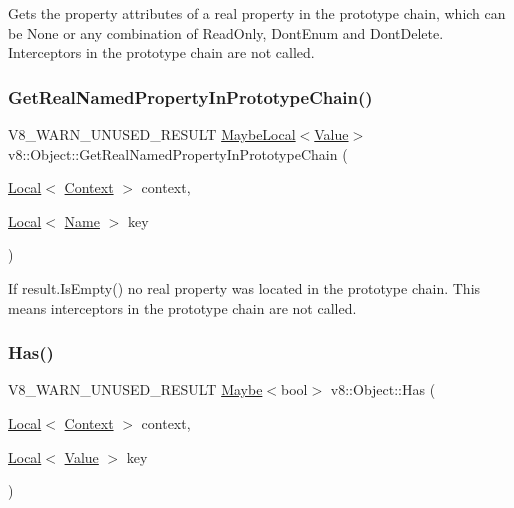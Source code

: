 Gets the property attributes of a real property in the prototype chain, which can be None or any combination of Read\+Only, Dont\+Enum and Dont\+Delete. Interceptors in the prototype chain are not called. \mbox{\label{classv8_1_1Object_afe68d490fc41783e30126ca547b7fc90}} 
\subsubsection{\texorpdfstring{Get\+Real\+Named\+Property\+In\+Prototype\+Chain()}{GetRealNamedPropertyInPrototypeChain()}}
{\footnotesize\ttfamily V8\+\_\+\+W\+A\+R\+N\+\_\+\+U\+N\+U\+S\+E\+D\+\_\+\+R\+E\+S\+U\+LT \mbox{\hyperlink{classv8_1_1MaybeLocal}{Maybe\+Local}}$<$\mbox{\hyperlink{classv8_1_1Value}{Value}}$>$ v8\+::\+Object\+::\+Get\+Real\+Named\+Property\+In\+Prototype\+Chain (\begin{DoxyParamCaption}\item[{\mbox{\hyperlink{classv8_1_1Local}{Local}}$<$ \mbox{\hyperlink{classv8_1_1Context}{Context}} $>$}]{context,  }\item[{\mbox{\hyperlink{classv8_1_1Local}{Local}}$<$ \mbox{\hyperlink{classv8_1_1Name}{Name}} $>$}]{key }\end{DoxyParamCaption})}

If result.\+Is\+Empty() no real property was located in the prototype chain. This means interceptors in the prototype chain are not called. \mbox{\label{classv8_1_1Object_a57d4819c2cc13715ed22dd23cdc84d7c}} 
\subsubsection{\texorpdfstring{Has()}{Has()}}
{\footnotesize\ttfamily V8\+\_\+\+W\+A\+R\+N\+\_\+\+U\+N\+U\+S\+E\+D\+\_\+\+R\+E\+S\+U\+LT \mbox{\hyperlink{classv8_1_1Maybe}{Maybe}}$<$bool$>$ v8\+::\+Object\+::\+Has (\begin{DoxyParamCaption}\item[{\mbox{\hyperlink{classv8_1_1Local}{Local}}$<$ \mbox{\hyperlink{classv8_1_1Context}{Context}} $>$}]{context,  }\item[{\mbox{\hyperlink{classv8_1_1Local}{Local}}$<$ \mbox{\hyperlink{classv8_1_1Value}{Value}} $>$}]{key }\end{DoxyParamCaption})}


